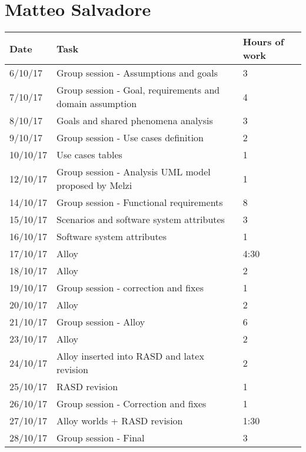 \section{Matteo Salvadore}
\begin{table}[H]
	\vspace*{-7pt}
	\begin{tabular}{ p{2cm} p{8cm} p{3cm}}
	Date & Task & Hours of work\\
	\hline
	6/10/17  & Group session - Assumptions and goals & 3 \\
	7/10/17  & Group session - Goal, requirements and domain assumption & 4 \\
	8/10/17  & Goals and shared phenomena analysis  & 3 \\
	9/10/17  & Group session - Use cases definition & 2 \\
	10/10/17  & Use cases tables & 1 \\
	12/10/17  & Group session - Analysis UML model proposed by Melzi & 1 \\
	14/10/17  & Group session - Functional requirements & 8 \\
	15/10/17  & Scenarios and software system attributes & 3 \\
	16/10/17  & Software system attributes & 1 \\
	17/10/17  & Alloy & 4:30  \\
	18/10/17  & Alloy & 2 \\
	19/10/17  & Group session - correction and fixes & 1 \\
	20/10/17   & Alloy & 2 \\
	21/10/17  & Group session - Alloy & 6 \\
	23/10/17  & Alloy & 2 \\
	24/10/17  & Alloy inserted into RASD and latex revision & 2 \\
	25/10/17  & RASD revision & 1 \\
	26/10/17  & Group session - Correction and fixes & 1 \\
	27/10/17  & Alloy worlds + RASD revision & 1:30 \\
	28/10/17  & Group session - Final  & 3 \\
	\end{tabular}
\end{table}